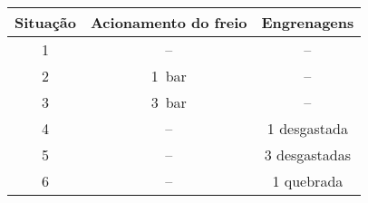\begin{tabular}{ccc}
  \toprule
  Situação & Acionamento do freio & Engrenagens    \\
  \midrule
  1        & --                   & --             \\
  2        & \SI{1}{\bar}         & --             \\
  3        & \SI{3}{\bar}         & --             \\
  4        & --                   & 1 desgastada   \\
  5        & --                   & 3 desgastadas  \\
  6        & --                   & 1 quebrada     \\
  \bottomrule
\end{tabular}
